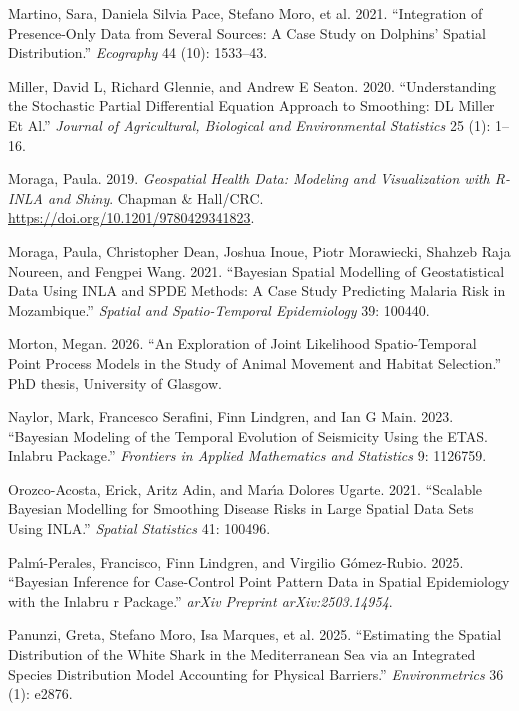 \documentclass[
  letterpaper,
  DIV=11,
  numbers=noendperiod]{scrartcl}
\newlength{\cslhangindent}
\newenvironment{CSLReferences}[2] %
 {\begin{list}{}{%
  \setlength{\itemindent}{0pt}
  \setlength{\leftmargin}{0pt}
  \setlength{\parsep}{0pt}
  \ifodd #1
   \setlength{\leftmargin}{\cslhangindent}
   \setlength{\itemindent}{-1\cslhangindent}
  \fi
  \setlength{\itemsep}{#2\baselineskip}}}
 {\end{list}}
\begin{document}
\begin{CSLReferences}{1}{1}
{Martino, Sara, Daniela Silvia Pace, Stefano Moro, et al.} 2021.
{``Integration of Presence-Only Data from Several Sources: A Case Study
on Dolphins' Spatial Distribution.''} \emph{Ecography} 44 (10):
1533--43.

Miller, David L, Richard Glennie, and Andrew E Seaton. 2020.
{``Understanding the Stochastic Partial Differential Equation Approach
to Smoothing: DL Miller Et Al.''} \emph{Journal of Agricultural,
Biological and Environmental Statistics} 25 (1): 1--16.

Moraga, Paula. 2019. \emph{Geospatial Health Data: Modeling and
Visualization with {R-INLA} and {Shiny}}. Chapman \& Hall/CRC.
\url{https://doi.org/10.1201/9780429341823}.

Moraga, Paula, Christopher Dean, Joshua Inoue, Piotr Morawiecki, Shahzeb
Raja Noureen, and Fengpei Wang. 2021. {``Bayesian Spatial Modelling of
Geostatistical Data Using INLA and SPDE Methods: A Case Study Predicting
Malaria Risk in Mozambique.''} \emph{Spatial and Spatio-Temporal
Epidemiology} 39: 100440.

Morton, Megan. 2026. {``An Exploration of Joint Likelihood
Spatio-Temporal Point Process Models in the Study of Animal Movement and
Habitat Selection.''} PhD thesis, University of Glasgow.

Naylor, Mark, Francesco Serafini, Finn Lindgren, and Ian G Main. 2023.
{``Bayesian Modeling of the Temporal Evolution of Seismicity Using the
ETAS. Inlabru Package.''} \emph{Frontiers in Applied Mathematics and
Statistics} 9: 1126759.

Orozco-Acosta, Erick, Aritz Adin, and Marı́a Dolores Ugarte. 2021.
{``Scalable Bayesian Modelling for Smoothing Disease Risks in Large
Spatial Data Sets Using INLA.''} \emph{Spatial Statistics} 41: 100496.

Palmı́-Perales, Francisco, Finn Lindgren, and Virgilio Gómez-Rubio. 2025.
{``Bayesian Inference for Case-Control Point Pattern Data in Spatial
Epidemiology with the Inlabru r Package.''} \emph{arXiv Preprint
arXiv:2503.14954}.

Panunzi, Greta, Stefano Moro, Isa Marques, et al. 2025. {``Estimating
the Spatial Distribution of the White Shark in the Mediterranean Sea via
an Integrated Species Distribution Model Accounting for Physical
Barriers.''} \emph{Environmetrics} 36 (1): e2876.


\end{CSLReferences}
\end{document}
